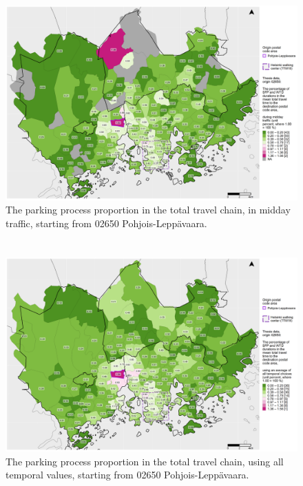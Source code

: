 \begin{figure}
    \section{}
    \centering
    \includegraphics[trim={0.9cm 0.3cm 0.25cm 0.3cm},clip,width=\textwidth]{images/compare_traveltimes_mapfill-msc_m_pct_fromzip-02650_16-10-2020.png}
    \caption[Parking process proportion from Pohjois-Leppävaara, midday traffic]{The parking process proportion in the total travel chain, in midday traffic, starting from 02650 Pohjois-Leppävaara.}%
    \label{fig:compare_msc_m_pct_02650}%
\end{figure}

\begin{figure}
    \section{}
    \centering
    \includegraphics[trim={0.9cm 0.3cm 0.25cm 0.3cm},clip,width=\textwidth]{images/compare_traveltimes_mapfill-msc_all_pct_fromzip-02650_16-10-2020.png}
    \caption[Parking process proportion from Pohjois-Leppävaara, all temporal values]{The parking process proportion in the total travel chain, using all temporal values, starting from 02650 Pohjois-Leppävaara.}%
    \label{fig:compare_msc_all_pct_02650}%
\end{figure}

